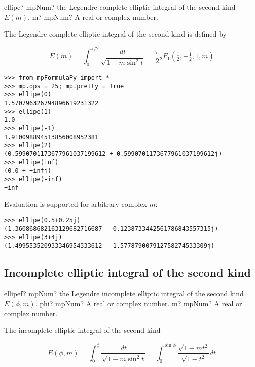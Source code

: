 \begin{mpFunctionsExtract}
	\mpFunctionOne
	{ellipe? mpNum? the Legendre complete elliptic integral of the second kind $E(m)$.}
	{m? mpNum? A real or complex number.}	
\end{mpFunctionsExtract}



\vpara
The Legendre complete elliptic integral of the second kind is defined by

\begin{equation}
E(m)=\int_0^{\pi/2} \frac{dt}{\sqrt{1-m \sin^2 t}} = \frac{\pi}{2} {}_2F_1 \left(\tfrac{1}{2},-\tfrac{1}{2},1,m \right)
\end{equation}


\begin{lstlisting}
>>> from mpFormulaPy import *
>>> mp.dps = 25; mp.pretty = True
>>> ellipe(0)
1.570796326794896619231322
>>> ellipe(1)
1.0
>>> ellipe(-1)
1.910098894513856008952381
>>> ellipe(2)
(0.5990701173677961037199612 + 0.5990701173677961037199612j)
>>> ellipe(inf)
(0.0 + +infj)
>>> ellipe(-inf)
+inf
\end{lstlisting}

Evaluation is supported for arbitrary complex $m$:

\begin{lstlisting}
>>> ellipe(0.5+0.25j)
(1.360868682163129682716687 - 0.1238733442561786843557315j)
>>> ellipe(3+4j)
(1.499553520933346954333612 - 1.577879007912758274533309j)
\end{lstlisting}



\subsection{Incomplete elliptic integral of the second kind}

\begin{mpFunctionsExtract}
	\mpFunctionTwo
	{ellipef? mpNum? the Legendre incomplete elliptic integral of the second kind $E(\phi,m)$.}
	{phi? mpNum? A real or complex number.}
	{m? mpNum? A real or complex number.}	
\end{mpFunctionsExtract}

\vpara
The incomplete elliptic integral of the second kind

\begin{equation}
E(\phi,m)=\int_0^{\phi} \frac{dt}{\sqrt{1-m \sin^2 t}} =\int_0^{\sin \phi} \frac{\sqrt{1-mt^2}}{\sqrt{1-t^2}} dt
\end{equation}

